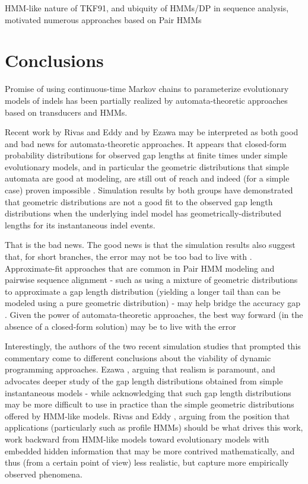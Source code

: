 \documentclass{bmcart}
\begin{document}
HMM-like nature of TKF91, and ubiquity of HMMs/DP in sequence analysis,
motivated numerous approaches based on Pair HMMs
\cite{ThorneEtal92,KnudsenMiyamoto2003,WangKeightleyJohnson2006,RivasEddy2008,RivasEddy2015}

\section*{Conclusions}

Promise of using continuous-time Markov chains to parameterize evolutionary models of indels
has been partially realized by automata-theoretic approaches
based on transducers and HMMs.

Recent work by Rivas and Eddy \cite{RivasEddy2015}
and by Ezawa \cite{Ezawa2016a,Ezawa2016b,Ezawa2016bErratum}
may be interpreted as both good and bad news for automata-theoretic approaches.
It appears that closed-form probability distributions for observed gap lengths at finite times
under simple evolutionary models,
and in particular the geometric distributions that simple automata are good at modeling,
are still out of reach and indeed (for a simple case) proven impossible \cite{RivasEddy2015}.
Simulation results by both groups have demonstrated that geometric distributions are not
a good fit to the observed gap length distributions when the underlying indel model
has geometrically-distributed lengths for its instantaneous indel events.

That is the bad news. The good news is that the simulation results also suggest that,
for short branches, the error may not be too bad to live with \cite{RivasEddy2015,Ezawa2016a}.
Approximate-fit approaches that are common in Pair HMM modeling and pairwise sequence alignment - such as using a mixture
of geometric distributions to approximate a gap length distribution (yielding a longer tail than can be modeled
using a pure geometric distribution) - may help bridge the accuracy gap \cite{DoEtAl2005}.
Given the power of automata-theoretic approaches, the best way forward
(in the absence of a closed-form solution) may be to live with the error

Interestingly, the authors of the two recent simulation studies that prompted this commentary
come to different conclusions about the viability of dynamic programming approaches.
Ezawa \cite{Ezawa2016a,Ezawa2016b}, arguing that realism is paramount, and advocates deeper study of the
gap length distributions obtained from simple instantaneous models - while acknowledging that such gap length distributions
may be more difficult to use in practice than the simple geometric distributions offered by HMM-like models.
Rivas and Eddy \cite{RivasEddy2015}, arguing from the position that applications (particularly such as profile HMMs)
should be what drives this work, work backward from HMM-like models toward evolutionary models with embedded
hidden information that may be more contrived mathematically, and thus (from a certain point of view) less realistic,
but capture more empirically observed phenomena.
\end{document}
